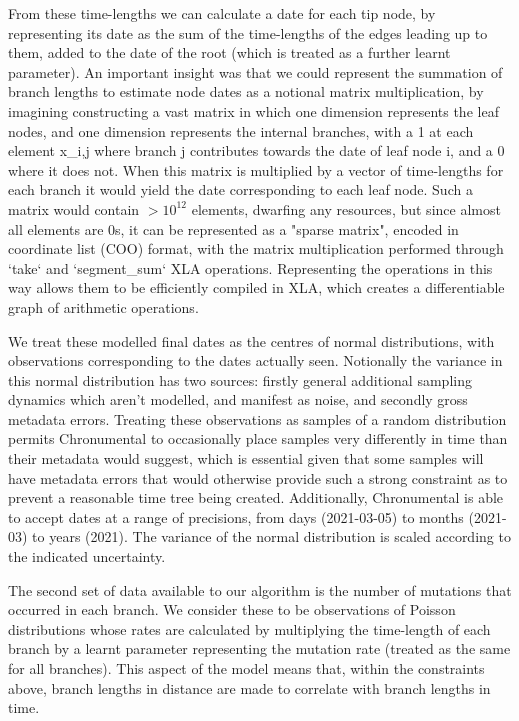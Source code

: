 From these time-lengths we can calculate a date for each tip node, by representing its date as the sum of the time-lengths of the edges leading up to them, added to the date of the root (which is treated as a further learnt parameter). An important insight was that we could represent the summation of branch lengths to estimate node dates as a notional matrix multiplication, by imagining constructing a vast matrix in which one dimension represents the leaf nodes, and one dimension represents the internal branches, with a 1 at each element x\_i,j where branch j contributes towards the date of leaf node i, and a 0 where it does not. When this matrix is multiplied by a vector of time-lengths for each branch it would yield the date corresponding to each leaf node.  Such a matrix would contain $>10^12$ elements, dwarfing any resources, but since almost all elements are 0s, it can be represented as a "sparse matrix", encoded in coordinate list (COO) format, with the matrix multiplication performed through `take` and `segment\_sum` XLA operations. Representing the operations in this way allows them to be efficiently compiled in XLA, which creates a differentiable graph of arithmetic operations. 

We treat these modelled final dates as the centres of normal distributions, with observations corresponding to the dates actually seen. Notionally the variance in this normal distribution has two sources: firstly general additional sampling dynamics which aren't modelled, and manifest as noise, and secondly gross metadata errors. Treating these observations as samples of a random distribution permits Chronumental to occasionally place samples very differently in time than their metadata would suggest, which is essential given that some samples will have metadata errors that would otherwise provide such a strong constraint as to prevent a reasonable time tree being created. Additionally, Chronumental is able to accept dates at a range of precisions, from days (2021-03-05) to months (2021-03) to years (2021). The variance of the normal distribution is scaled according to the indicated uncertainty.

The second set of data available to our algorithm is the number of mutations that occurred in each branch. We consider these to be observations of Poisson distributions whose rates are calculated by multiplying the time-length of each branch by a learnt parameter representing the mutation rate (treated as the same for all branches). This aspect of the model means that, within the constraints above, branch lengths in distance are made to correlate with branch lengths in time.

